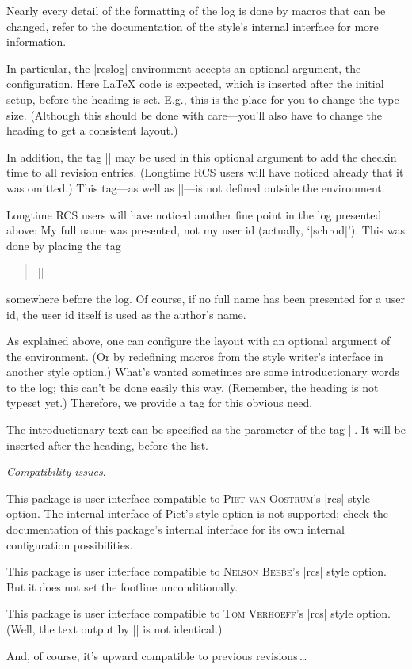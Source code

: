 \sect Nearly every detail of the formatting of the log is done by
macros that can be changed, refer to the documentation of the style's
internal interface for more information.

In particular, the |rcslog| environment accepts an optional argument,
the configuration. Here \LaTeX{} code is expected, which is inserted
after the initial setup, before the heading is set. E.g., this is the
place for you to change the type size. (Although this should be done
with care---you'll also have to change the heading to get a consistent
layout.)

In addition, the tag |\settime| may be used in this optional argument
to add the checkin time to all revision entries. (Longtime RCS users
will have noticed already that it was omitted.) This tag---as well
as |\Revision|---is not defined outside the environment.


\sect Longtime RCS users will have noticed another fine point in the
log presented above: My full name was presented, not my user id
(actually, `|schrod|'). This was done by placing the tag
\begin{quote}
  ||
\end{quote}
somewhere before the log. Of course, if no full name has been
presented for a user id, the user id itself is used as the author's
name.


\sect As explained above, one can configure the layout with an
optional argument of the environment. (Or by redefining macros from
the style writer's interface in another style option.) What's wanted
sometimes are some introductionary words to the log; this can't be
done easily this way. (Remember, the heading is not typeset yet.)
Therefore, we provide a tag for this obvious need.

The introductionary text can be specified as the parameter of the tag
|\rcsLogIntro|. It will be inserted after the heading, before the
\Log{} list.



\sect \textsl{Compatibility issues}.

\medskip

\noindent This package is user interface compatible to \textsc{Piet van
Oostrum}'s |rcs| style option. The internal interface of Piet's style
option is not supported; check the documentation of this package's
internal interface for its own internal configuration possibilities.

This package is user interface compatible to \textsc{Nelson Beebe}'s |rcs|
style option. But it does not set the footline unconditionally.

This package is user interface compatible to \textsc{Tom Verhoeff}'s |rcs|
style option. (Well, the text output by |\RCSdef| is not identical.)

And, of course, it's upward compatible to previous revisions\,\dots



\endDocument

